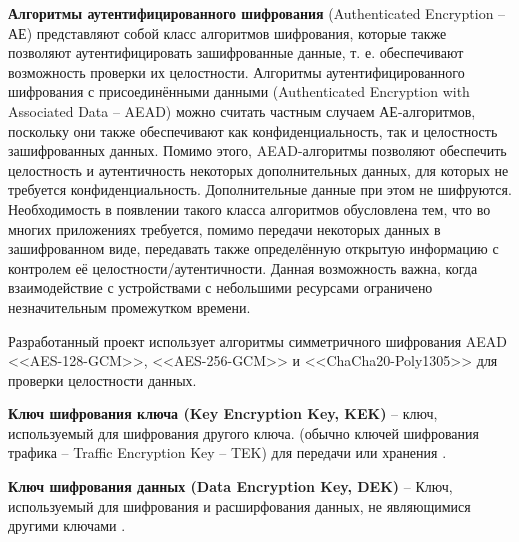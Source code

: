 \documentclass[14pt, a4paper]{extarticle}
\newcommand{\addsubsubsection}[1]{\refstepcounter{subsubsection}\addcontentsline{toc}{subsubsection}{\protect\numberline{\thesubsubsection}#1}}
\begin{document}
	\textbf{Алгоритмы аутентифицированного шифрования} (Authenticated Encryption -- АЕ) \label{def:AEAD}
	представляют собой класс алгоритмов шифрования, которые также позволяют аутентифицировать зашифрованные данные, т. е. обеспечивают возможность проверки их
	целостности.
	Алгоритмы аутентифицированного шифрования с присоединёнными данными
	(Authenticated Encryption with Associated Data -- AEAD) можно считать частным случаем АЕ-алгоритмов, поскольку они также обеспечивают как конфиденциальность,
	так и целостность зашифрованных данных. Помимо этого, AEAD-алгоритмы позволяют обеспечить целостность и аутентичность некоторых дополнительных данных,
	для которых не требуется конфиденциальность. Дополнительные данные при этом не
	шифруются.
	Необходимость в появлении такого класса алгоритмов обусловлена тем, что во многих приложениях требуется, помимо передачи некоторых данных в зашифрованном
	виде, передавать также определённую открытую информацию с контролем её целостности/аутентичности. Данная возможность важна, когда взаимодействие с устройствами с небольшими ресурсами ограничено незначительным промежутком времени.
	
	Разработанный проект использует алгоритмы симметричного шифрования AEAD <<AES-128-GCM>>, <<AES-256-GCM>> и <<ChaCha20-Poly1305>> для проверки целостности данных.	
	
	\textbf{Ключ шифрования ключа (Key Encryption Key, KEK)} -- ключ, используемый для шифрования другого ключа. (обычно ключей шифрования трафика -- Traffic Encryption Key -- TEK) для передачи или хранения \cite{CNSSI_4009_2015}.
	
	\textbf{Ключ шифрования данных (Data Encryption Key, DEK)} -- Ключ, используемый для шифрования и расширфования данных, не являющимися другими ключами \cite{NIST_SP_800-57_Part_1_Rev._5}.
%	 
\end{document}
